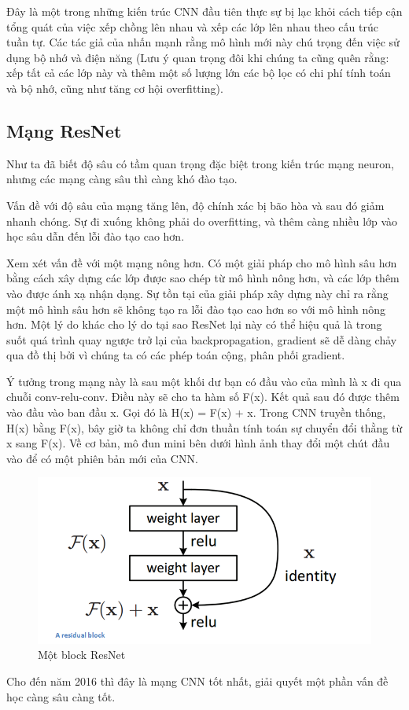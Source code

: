Đây là một trong những kiến trúc CNN đầu tiên thực sự bị lạc khỏi cách tiếp cận tổng quát của việc xếp chồng lên nhau và xếp các lớp lên nhau theo cấu trúc tuần tự. Các tác giả của nhấn mạnh rằng mô hình mới này chú trọng đến việc sử dụng bộ nhớ và điện năng (Lưu ý quan trọng đôi khi chúng ta cũng quên rằng: xếp tất cả các lớp này và thêm một số lượng lớn các bộ lọc có chi phí tính toán và bộ nhớ, cũng như tăng cơ hội overfitting).

\subsection{Mạng ResNet \cite{renset}}

Như ta đã biết độ sâu có tầm quan trọng đặc biệt trong kiến trúc mạng neuron, nhưng các mạng càng sâu thì càng khó đào tạo.

Vấn đề với độ sâu của mạng tăng lên, độ chính xác bị bão hòa và sau đó giảm nhanh chóng. Sự đi xuống không phải do overfitting, và thêm càng  nhiều lớp vào học sâu dẫn đến lỗi đào tạo cao hơn.

Xem xét vấn đề với một mạng nông hơn. Có một giải pháp cho mô hình sâu hơn bằng cách xây dựng các lớp được sao chép từ mô hình nông hơn, và các lớp thêm vào được ánh xạ nhận dạng. Sự tồn tại của giải pháp xây dựng này chỉ ra rằng một mô hình sâu hơn sẽ không tạo ra lỗi đào tạo cao hơn so với mô hình nông hơn. Một lý do khác cho lý do tại sao ResNet lại này có thể hiệu quả là trong suốt quá trình quay ngược trở lại của backpropagation, gradient sẽ dễ dàng chảy qua đồ thị bởi vì chúng ta có các phép toán cộng, phân phối gradient.

Ý tưởng trong mạng này là sau một khối dư bạn có đầu vào của mình là x đi qua chuỗi conv-relu-conv. Điều này sẽ cho ta hàm số F(x). Kết quả sau đó được thêm vào đầu vào ban đầu x. Gọi đó là H(x) = F(x) + x. Trong CNN truyền thống, H(x) bằng F(x), bây giờ ta không chỉ đơn thuần tính toán sự chuyển đổi thằng từ x sang F(x). Về cơ bản, mô đun mini bên dưới hình ảnh thay đổi một chút đầu vào để có một phiên bản mới của CNN. 

\begin{center}
    \begin{figure}[h!]
    \begin{center}
     \includegraphics[scale=0.5]{img/ResNet.png}
    \end{center}
    \caption{Một block ResNet \cite{renset}}
    \label{refhinh13}
    \end{figure}
\end{center}

Cho đến năm 2016 thì đây là mạng CNN tốt nhất, giải quyết một phần vấn đề học càng sâu càng tốt.
